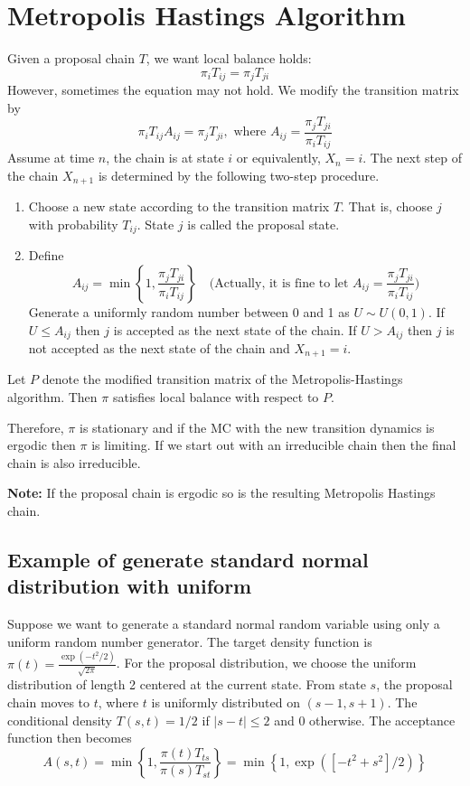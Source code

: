 \documentclass[11pt]{elegantbook}
\begin{document}
\section{Metropolis Hastings Algorithm}
Given a proposal chain $T$, we want local balance holds: $$\pi_i T_{ij}=\pi_j T_{ji}$$
However, sometimes the equation may not hold. We modify the transition matrix by $$\pi_i T_{ij}A_{ij}=\pi_j T_{ji},\text{ where }A_{ij}=\frac{\pi_j T_{j i}}{\pi_i T_{i j}}$$
Assume at time $n$, the chain is at state $i$ or equivalently, $X_n=i$. The next step of the chain $X_{n+1}$ is determined by the following two-step procedure.
\begin{enumerate}
    \item Choose a new state according to the transition matrix $T$. That is, choose $j$ with probability $T_{i j}$. State $j$ is called the proposal state.
    \item Define
    $$
    A_{i j}=\min \left\{1, \frac{\pi_j T_{j i}}{\pi_i T_{i j}}\right\}\quad \text{(Actually, it is fine to let $A_{ij}=\frac{\pi_j T_{j i}}{\pi_i T_{i j}}$)}
    $$
    Generate a uniformly random number between 0 and 1 as $U \sim U(0,1)$. If $U \leq A_{i j}$ then $j$ is accepted as the next state of the chain. If $U>A_{i j}$ then $j$ is not accepted as the next state of the chain and $X_{n+1}=i$.
\end{enumerate}
\begin{lemma}
    Let $P$ denote the modified transition matrix of the Metropolis-Hastings algorithm. Then $\pi$ satisfies local balance with respect to $P$.
\end{lemma}

Therefore, $\pi$ is stationary and if the MC with the new transition dynamics is ergodic then $\pi$ is limiting. If we start out with an irreducible chain then the final chain is also irreducible.

\textbf{Note:} If the proposal chain is ergodic so is the resulting Metropolis Hastings chain.


\subsection{Example of generate standard normal distribution with uniform}
Suppose we want to generate a standard normal random variable using only a uniform random number generator. The target density function is $\pi(t)=\frac{\exp \left(-t^2 / 2\right)}{\sqrt{2 \pi}}$. For the proposal distribution, we choose the uniform distribution of length 2 centered at the current state. From state $s$, the proposal chain moves to $t$, where $t$ is uniformly distributed on $(s-1, s+1)$. The conditional density $T(s, t)=1 / 2$ if $|s-t| \leq 2$ and 0 otherwise. The acceptance function then becomes
$$
A(s, t)=\min \left\{1, \frac{\pi(t) T_{t s}}{\pi(s) T_{s t}}\right\}=\min \left\{1, \exp \left(\left[-t^2+s^2\right] / 2\right)\right\}
$$
\end{document}

